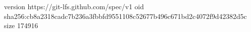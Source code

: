 version https://git-lfs.github.com/spec/v1
oid sha256:cb8a2318cadc7b236a3fbbfd9551108c52677b496c671bd2c4072f9d42382d5c
size 174916
